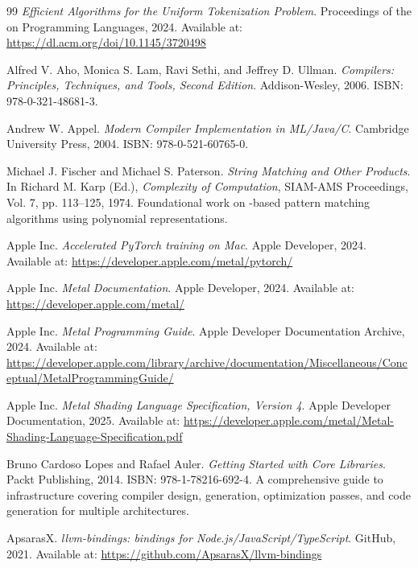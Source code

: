 \begin{thebibliography}{99}
\textit{Efficient Algorithms for the Uniform Tokenization Problem}. Proceedings of the  on Programming Languages, 2024. Available at: \url{https://dl.acm.org/doi/10.1145/3720498}

Alfred V. Aho, Monica S. Lam, Ravi Sethi, and Jeffrey D. Ullman. \textit{Compilers: Principles, Techniques, and Tools, Second Edition}. Addison-Wesley, 2006. ISBN: 978-0-321-48681-3.

Andrew W. Appel. \textit{Modern Compiler Implementation in ML/Java/C}. Cambridge University Press, 2004. ISBN: 978-0-521-60765-0.

Michael J. Fischer and Michael S. Paterson. \textit{String Matching and Other Products}. In Richard M. Karp (Ed.), \textit{Complexity of Computation}, SIAM-AMS Proceedings, Vol. 7, pp. 113–125, 1974. Foundational work on -based pattern matching algorithms using polynomial representations.

Apple Inc. \textit{Accelerated PyTorch training on Mac}. Apple Developer, 2024. Available at: \url{https://developer.apple.com/metal/pytorch/}

Apple Inc. \textit{Metal Documentation}. Apple Developer, 2024. Available at: \url{https://developer.apple.com/metal/}

Apple Inc. \textit{Metal Programming Guide}. Apple Developer Documentation Archive, 2024. Available at: \url{https://developer.apple.com/library/archive/documentation/Miscellaneous/Conceptual/MetalProgrammingGuide/}

Apple Inc. \textit{Metal Shading Language Specification, Version 4}. Apple Developer Documentation, 2025. Available at: \url{https://developer.apple.com/metal/Metal-Shading-Language-Specification.pdf}

Bruno Cardoso Lopes and Rafael Auler. \textit{Getting Started with  Core Libraries}. Packt Publishing, 2014. ISBN: 978-1-78216-692-4. A comprehensive guide to  infrastructure covering compiler design,  generation, optimization passes, and code generation for multiple architectures.

ApsarasX. \textit{llvm-bindings:  bindings for Node.js/JavaScript/TypeScript}. GitHub, 2021. Available at: \url{https://github.com/ApsarasX/llvm-bindings}


\end{thebibliography}
